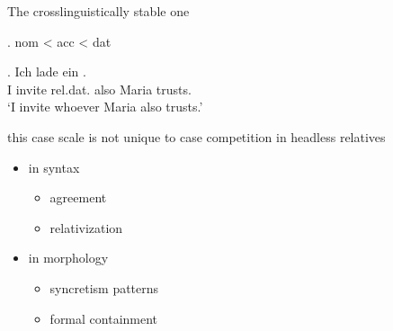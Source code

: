 \documentclass[12pt]{beamer}
\newcommand*{\mybox}[1]{\framebox{#1}} %
\begin{document}
\begin{frame}{The crosslinguistically stable one}

\pause

\ex. \ac{nom} < \ac{acc} < \ac{dat}\pause

\exg. Ich {lade ein} \mybox{\tbf{wem}}   . \\
 I invite\scsub{[acc]} \ac{rel}.\ac{dat}. also Maria trusts\scsub{[dat]}.\\
 `I invite whoever Maria also trusts.' \label{ex:mg-acc-dat-rep} \pause

this case scale is not unique to case competition in headless relatives \pause

\begin{itemize}
  \item in syntax
  \begin{itemize}
    \item agreement \citep[cf.][]{moravcsik1978}
    \item relativization \citep[cf.][]{keenan1977}
  \end{itemize} \pause
  \item in morphology
  \begin{itemize}
    \item syncretism patterns \citep[cf.][]{baerman2005}
    \item formal containment \citep[cf.][]{caha2010}
  \end{itemize}
\end{itemize}


\end{frame}
\end{document}
